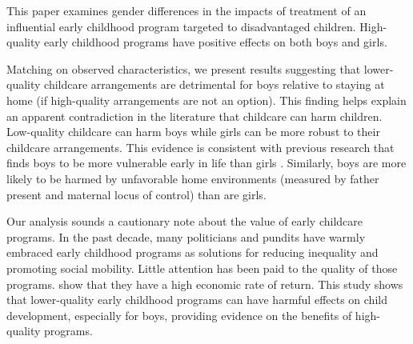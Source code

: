 This paper examines gender differences in the impacts of treatment of an influential early childhood program targeted to disadvantaged children. High-quality early childhood programs have positive effects on both boys and girls. 

Matching on observed characteristics, we present results suggesting that lower-quality childcare arrangements are detrimental for boys relative to staying at home (if high-quality arrangements are not an option). This finding helps explain an apparent contradiction in the literature \citep{Baker_Gruber_etal_2008_JPE,Baker_Gruber_Milligan_2015_Noncog_Defects,Kottelenberg_Lehrer_2014_Gender-Effects} that childcare can harm children. Low-quality childcare can harm boys while girls can be more robust to their childcare arrangements. This evidence is consistent with previous research that finds boys to be more vulnerable early in life than girls \citep{Golding_Fitzgerald_2017_IMHJ}. Similarly, boys are more likely to be harmed by unfavorable home environments (measured by father present and maternal locus of control) than are girls.

Our analysis sounds a cautionary note about the value of early childcare programs. In the past decade, many politicians and pundits have warmly embraced early childhood programs as solutions for reducing inequality and promoting social mobility. Little attention has been paid to the quality of those programs. \cite{Garcia_Heckman_Leaf_etal_2017_Comp_CBA_Unpublished} show that they have a high economic rate of return. This study shows that lower-quality early childhood programs can have harmful effects on child development, especially for boys, providing evidence on the benefits of high-quality programs.

